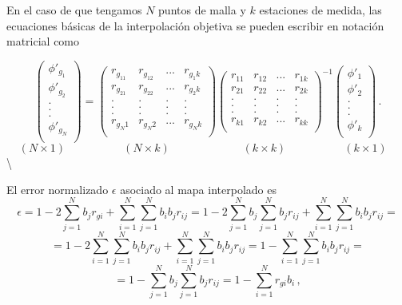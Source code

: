 \documentclass[
]{agujournal2019}
\begin{document}
En el caso de que tengamos \(N\) puntos de malla y \(k\) estaciones de
medida, las ecuaciones básicas de la interpolación objetiva se pueden
escribir en notación matricial como

\[\left(\begin{array}{c}
  \phi'_{g_1} \\
  \phi'_{g_2} \\
  . \\
  . \\
  . \\
  \phi'_{g_N} \\
     \end{array}\right)=
\left(\begin{array}{ccccc}
  r_{g_11} & r_{g_12} &... &  r_{g_1k}\\
  r_{g_21} & r_{g_22} &... &  r_{g_2k}\\
  . & . & . & . \\
  . & . & . & . \\
  . & . & . & . \\
  r_{g_N1} & r_{g_N2} & ... & r_{g_Nk}\\
     \end{array}\right)
 \left(\begin{array}{ccccc}
  r_{11} & r_{12} &... &  r_{1k}\\
  r_{21} & r_{22} &... &  r_{2k}\\
  . & . & . & . \\
  . & . & . & . \\
  . & . & . & . \\
  r_{k1} & r_{k2} & ... & r_{kk}\\
     \end{array}\right)^{-1}       \left(\begin{array}{c}
  \phi'_1 \\
  \phi'_2 \\
  . \\
  . \\
  . \\
  \phi'_k \\
     \end{array}\right)
     \,.\]
\[\left( N \times 1 \right)\,\,\,\,\,\,\,\,\,\,\,\,\,\,\,\,\,\,\,\,\,\,\,\,\,\,\,\,\,\,\,
  \left( N \times k \right)\,\,\,\,\,\,\,\,\,\,\,\,\,\,\,\,\,\,\,\,\,\,\,\,\,\,\,\,\,\,\,
  \,\,\,\,\,\,\,\,\left( k \times k \right)\,\,\,\,\,\,\,\,\,\,\,\,\,\,\,\,\,\,\,\,\,\,\,\,\,\,\,\,\,\,\,
  \left( k \times 1 \right)\,\,\,\,\,\] \textbackslash{}

El error normalizado \(\epsilon\) asociado al mapa interpolado es
\[\epsilon=1-2 \sum\limits^N_{j=1} b_j r_{gi} + \sum\limits^N_{i=1}\sum\limits^N_{j=1} b_i b_j r_{ij}=
           1-2 \sum\limits^N_{j=1} b_j \sum\limits^N_{j=1} b_j r_{ij} + \sum\limits^N_{i=1}\sum\limits^N_{j=1} b_i b_j r_{ij}=\]
\[=1-2\sum\limits^N_{i=1}\sum\limits^N_{j=1} b_i b_j r_{ij} + \sum\limits^N_{i=1}\sum\limits^N_{j=1} b_i b_j r_{ij} =1-\sum\limits^N_{i=1}\sum\limits^N_{j=1} b_i b_j r_{ij}=\]
\[= 1- \sum\limits^N_{j=1} b_j \sum\limits^N_{j=1} b_j r_{ij}  =1-\sum\limits^N_{i=1}r_{gi}b_i\,,\]
\end{document}
